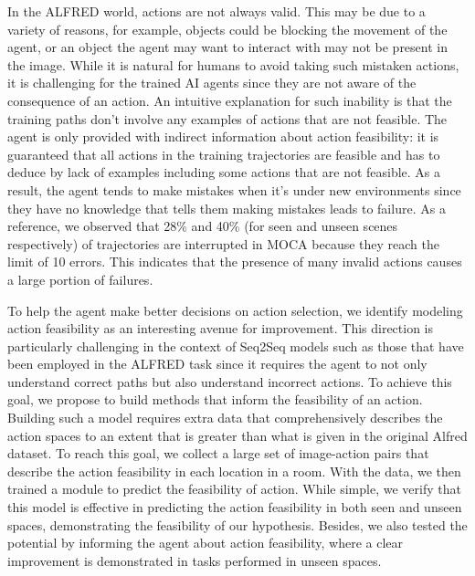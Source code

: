 \documentclass[11pt,a4paper]{article}
\begin{document}
In the ALFRED world, actions are not always valid. This may be due to a variety of reasons, for example, objects could be blocking the movement of the agent, or an object the agent may want to interact with  may not be present in the image.  While it is natural for humans to avoid taking such mistaken actions, it is challenging for the trained AI agents since they are not aware of the consequence of an action. An intuitive explanation for such inability is that the training paths don't involve any examples of actions that are not feasible. The agent is only provided with indirect information about action feasibility: it is guaranteed that all actions in the training trajectories are feasible and has to deduce by lack of examples including some actions that are not feasible. As a result, the agent tends to make mistakes when it's under new environments since they have no knowledge that tells them making mistakes leads to failure. As a reference, we observed that 28\% and 40\% (for seen and unseen scenes respectively) of trajectories are interrupted in MOCA \cite{singh2020moca} because they reach the limit of 10 errors. This indicates that the presence of many invalid actions causes a large portion of failures.

To help the agent make better decisions on action selection, we identify modeling action feasibility as an interesting avenue for improvement. This direction is particularly challenging in the context of Seq2Seq models such as those that have been employed in the ALFRED task since it requires the agent to not only understand correct paths but also understand incorrect actions. To achieve this goal, we propose to build methods that inform the feasibility of an action. Building such a model requires extra data that comprehensively describes the action spaces to an extent that is greater than what is given in the original Alfred dataset. To reach this goal, we collect a large set of image-action pairs that describe the action feasibility in each location in a room. With the data, we then trained a module to predict the feasibility of action. While simple, we verify that this model is effective in predicting the action feasibility in both seen and unseen spaces, demonstrating the feasibility of our hypothesis. Besides, we also tested the potential by informing the agent about action feasibility, where a clear improvement is demonstrated in tasks performed in unseen spaces.


\end{document}
